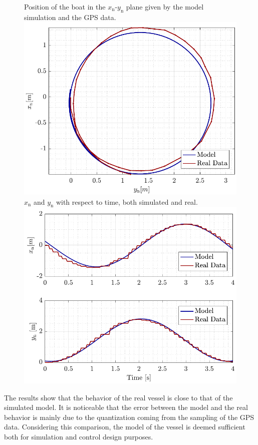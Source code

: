 \begin{figure}[H]
    \captionbox 
    {   
        Position of the boat in the $x_\mathrm{n}$-$y_\mathrm{n}$ plane given by the model simulation and the GPS data.
        \label{fig:turn}
    }                                                                 
    {                                                                  
        \includegraphics[width=.45\textwidth]{figures/turn}         
    }                                                                    
    \hspace{5pt}                                                          
    \captionbox  
    {      
        $x_\mathrm{n}$ and $y_\mathrm{n}$ with respect to time, both simulated and real.
        \label{fig:turn_time}
    }                                                                        
    {
        \includegraphics[width=.45\textwidth]{figures/turn_time}
    }
\end{figure}

The results show that the behavior of the real vessel is close to that of the simulated model. It is noticeable that the error between the model and the real behavior is mainly due to the quantization coming from the sampling of the GPS data. Considering this comparison, the model of the vessel is deemed sufficient both for simulation and control design purposes. 


